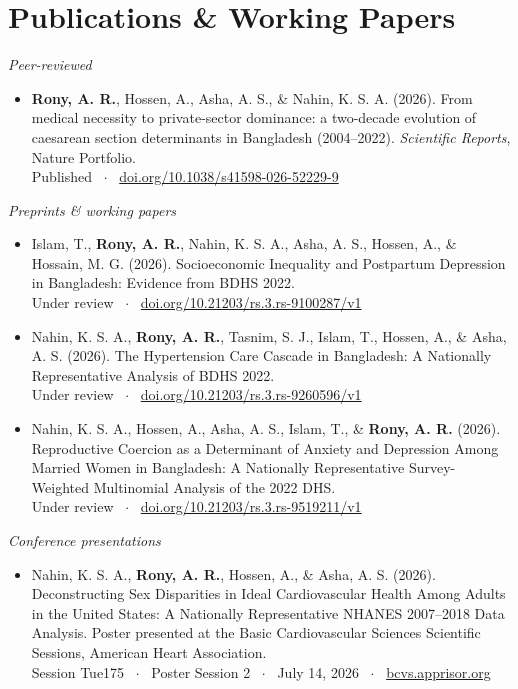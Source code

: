 \documentclass[11pt]{article}
\begin{document}
\section*{Publications \& Working Papers}

\textit{Peer-reviewed}
\begin{itemize}[itemsep=5pt]
  \item \textbf{Rony, A. R.}, Hossen, A., Asha, A. S., \& Nahin, K. S. A. (2026). From medical necessity to private-sector dominance: a two-decade evolution of caesarean section determinants in Bangladesh (2004--2022). \textit{Scientific Reports}, Nature Portfolio. \\
  {\small Published \ $\cdot$ \ \href{https://doi.org/10.1038/s41598-026-52229-9}{doi.org/10.1038/s41598-026-52229-9}}
\end{itemize}

\textit{Preprints \& working papers}
\begin{itemize}[itemsep=5pt]
  \item Islam, T., \textbf{Rony, A. R.}, Nahin, K. S. A., Asha, A. S., Hossen, A., \& Hossain, M. G. (2026). Socioeconomic Inequality and Postpartum Depression in Bangladesh: Evidence from BDHS 2022. \\
  {\small Under review \ $\cdot$ \ \href{https://doi.org/10.21203/rs.3.rs-9100287/v1}{doi.org/10.21203/rs.3.rs-9100287/v1}}
  \item Nahin, K. S. A., \textbf{Rony, A. R.}, Tasnim, S. J., Islam, T., Hossen, A., \& Asha, A. S. (2026). The Hypertension Care Cascade in Bangladesh: A Nationally Representative Analysis of BDHS 2022. \\
  {\small Under review \ $\cdot$ \ \href{https://doi.org/10.21203/rs.3.rs-9260596/v1}{doi.org/10.21203/rs.3.rs-9260596/v1}}
  \item Nahin, K. S. A., Hossen, A., Asha, A. S., Islam, T., \& \textbf{Rony, A. R.} (2026). Reproductive Coercion as a Determinant of Anxiety and Depression Among Married Women in Bangladesh: A Nationally Representative Survey-Weighted Multinomial Analysis of the 2022 DHS. \\
  {\small Under review \ $\cdot$ \ \href{https://doi.org/10.21203/rs.3.rs-9519211/v1}{doi.org/10.21203/rs.3.rs-9519211/v1}}
\end{itemize}

\textit{Conference presentations}
\begin{itemize}[itemsep=5pt]
  \item Nahin, K. S. A., \textbf{Rony, A. R.}, Hossen, A., \& Asha, A. S. (2026). Deconstructing Sex Disparities in Ideal Cardiovascular Health Among Adults in the United States: A Nationally Representative NHANES 2007--2018 Data Analysis. Poster presented at the Basic Cardiovascular Sciences Scientific Sessions, American Heart Association. \\
  {\small Session Tue175 \ $\cdot$ \ Poster Session 2 \ $\cdot$ \ July 14, 2026 \ $\cdot$ \ \href{https://bcvs.apprisor.org/epsAbstractBCVS.cfm?id=1}{bcvs.apprisor.org}}
\end{itemize}
\end{document}
